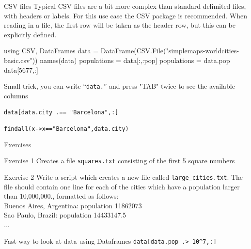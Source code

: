 \documentclass{beamer}
\newenvironment{Boxx}{\begin{tcolorbox}[standard jigsaw, opacityframe=0.8, opacityback=0.0,left=2pt,right=2pt,top=0pt,bottom=0pt]}{\end{tcolorbox}}
\begin{document}
\begin{frame}[fragile]{CSV files}
	Typical CSV files are a bit more complex than standard delimited files, with headers or labels. For this use case the CSV package is recommended. When reading in a file, the first row will be taken as the header row, but this can be explicitly defined.

  \begin{Boxx}
  \begin{jllisting}
  	using CSV, DataFrames
	data = DataFrame(CSV.File("simplemaps-worldcities-basic.csv"))
	names(data)
	populations = data[:,:pop]
	populations = data.pop
	data[5677,:]
	\end{jllisting}
  \end{Boxx}
	
	
	
	Small trick, you can write ``\verb|data.|'' and press "TAB" twice to see the available columns
	
	
	\tiny
	{\color{gray}\verb|data[data.city .== "Barcelona",:]|
	
	\verb|findall(x->x=="Barcelona",data.city)|}
	
\end{frame}

\begin{frame}[fragile]{Exercises}
	\begin{block}{Exercise 1}
		Creates a file \verb|squares.txt| consisting of the first 5 square numbers
	\end{block}
	\begin{block}{Exercise 2}
		Write a script which creates a new file called \verb|large_cities.txt|.
		The file should contain one line for each of the cities which have a
		population larger than 10,000,000., formatted as follows:\\
		Buenos Aires, Argentina: population 11862073\\
		Sao Paulo, Brazil: population 14433147.5\\
		...
	\end{block}
	
	
	{\color{gray} \tiny
	Fast way to look at data using Dataframes \verb|data[data.pop .> 10^7,:]|
	}
	
\end{frame}
\end{document}
